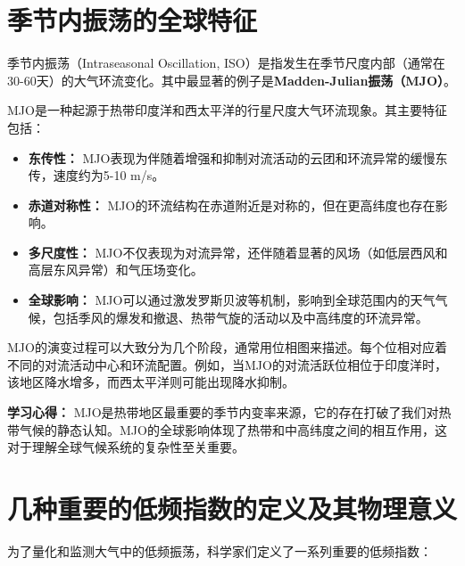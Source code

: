 \documentclass[10pt,hyperref,a4paper,UTF8]{ctexart}
\begin{document}
\section{季节内振荡的全球特征}

季节内振荡（Intraseasonal Oscillation, ISO）是指发生在季节尺度内部（通常在30-60天）的大气环流变化。其中最显著的例子是\textbf{Madden-Julian振荡（MJO）}。

MJO是一种起源于热带印度洋和西太平洋的行星尺度大气环流现象。其主要特征包括：

\begin{itemize}
    \item \textbf{东传性：} MJO表现为伴随着增强和抑制对流活动的云团和环流异常的缓慢东传，速度约为5-10 m/s。
    \item \textbf{赤道对称性：} MJO的环流结构在赤道附近是对称的，但在更高纬度也存在影响。
    \item \textbf{多尺度性：} MJO不仅表现为对流异常，还伴随着显著的风场（如低层西风和高层东风异常）和气压场变化。
    \item \textbf{全球影响：} MJO可以通过激发罗斯贝波等机制，影响到全球范围内的天气气候，包括季风的爆发和撤退、热带气旋的活动以及中高纬度的环流异常。
\end{itemize}

MJO的演变过程可以大致分为几个阶段，通常用位相图来描述。每个位相对应着不同的对流活动中心和环流配置。例如，当MJO的对流活跃位相位于印度洋时，该地区降水增多，而西太平洋则可能出现降水抑制。

\textbf{学习心得：} MJO是热带地区最重要的季节内变率来源，它的存在打破了我们对热带气候的静态认知。MJO的全球影响体现了热带和中高纬度之间的相互作用，这对于理解全球气候系统的复杂性至关重要。

\section{几种重要的低频指数的定义及其物理意义}

为了量化和监测大气中的低频振荡，科学家们定义了一系列重要的低频指数：
\end{document}
